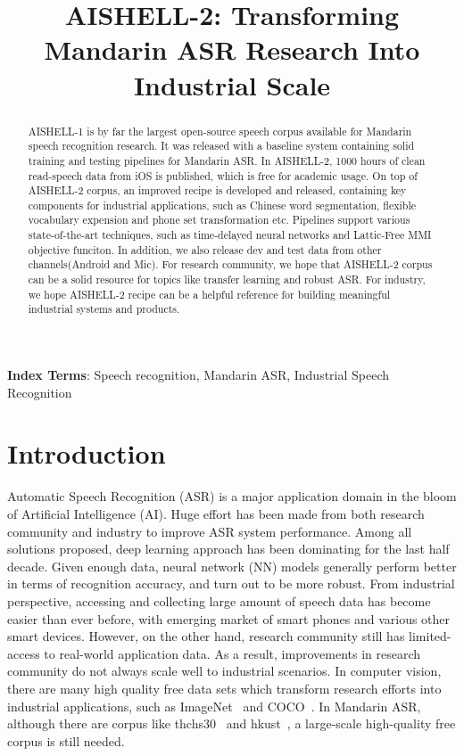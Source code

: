 \documentclass[a4paper]{article}
\title{AISHELL-2: Transforming Mandarin ASR Research Into Industrial Scale}
\begin{document}
\maketitle
%
\begin{abstract}
AISHELL-1 is by far the largest open-source speech corpus available for Mandarin
speech recognition research. It was released with a baseline system containing solid
training and testing pipelines for Mandarin ASR. In AISHELL-2, 1000 hours of
clean read-speech data from iOS is published, which is free for academic usage. On top of
AISHELL-2 corpus, an improved recipe is developed and released, containing key
components for industrial applications, such as Chinese word segmentation,
flexible vocabulary expension and phone set transformation etc.
Pipelines support various state-of-the-art techniques, such
as time-delayed neural networks and Lattic-Free MMI objective funciton.
In addition, we also release dev and test data from other channels(Android and Mic).
For research community, we hope that AISHELL-2
corpus can be a solid resource for topics like transfer learning and robust
ASR. For industry, we hope AISHELL-2 recipe can be a helpful reference for
building meaningful industrial systems and products.
\end{abstract}
\noindent\textbf{Index Terms}: Speech recognition, Mandarin ASR, Industrial Speech Recognition

\section{Introduction}

Automatic Speech Recognition (ASR) is a major application domain in the bloom of Artificial
Intelligence (AI). Huge effort has been made from both research community and industry to improve ASR system performance. Among all solutions proposed, deep learning approach has been dominating for the last half decade. Given enough data, neural network (NN) models generally perform better in terms of recognition accuracy, and turn out to be more robust.
From industrial perspective, accessing and collecting large amount of speech data has become easier than ever before, with emerging market of smart phones and various other smart devices.
However, on the other hand, research community still has limited-access to real-world application data. As a result, improvements in research community do not always scale well to industrial scenarios.
In computer vision, there are many high quality free data sets which transform research efforts into industrial applications, such as ImageNet~\cite{imagenet} and COCO~\cite{coco}.
In Mandarin ASR, although there are corpus like thchs30~\cite{thchs30} and hkust~\cite{hkust1}, a large-scale high-quality free corpus is still needed.
\end{document}
